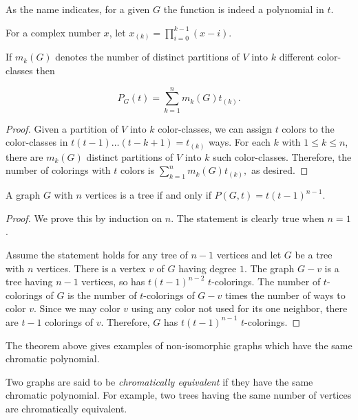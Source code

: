 As the name indicates, for a given $G$ the function is indeed a
polynomial in $t$.

For a complex number $x$, let $x_{(k)}=\prod_{i=0}^{k-1} (x-i)$.

\begin{lemma}
If $m_k(G)$ denotes the number of distinct partitions of $V$
into $k$ different color-classes then

\[
P_G(t) = \sum_{k=1}^n m_k(G)t_{(k)}.
\]
\end{lemma}


\begin{proof}
Given a partition of $V$ into $k$ color-classes, we can assign
$t$ colors to the color-classes in $t(t-1)\dots (t-k+1)=t_{(k)}$ ways.
For each $k$ with $1\leq k\leq n$, there are
$m_k(G)$ distinct partitions of $V$ into $k$ such color-classes.
Therefore, the number of colorings with $t$ colors is
$ \sum_{k=1}^n m_k(G)t_{(k)},$ as desired.

\end{proof}



\begin{theorem}
A graph $G$ with $n$ vertices is a tree if and only if $P(G, t) =
t(t-1)^{n-1}$.
\end{theorem}

\begin{proof}
We prove this by induction on $n$. The statement is clearly
true when $n=1$.

Assume the statement holds for any tree of $n-1$ vertices
and let $G$ be a tree with $n$ vertices. There is a vertex $v$
of $G$ having degree $1$. The graph $G-v$ is a tree having $n-1$
vertices, so has $t(t-1)^{n-2}$ $t$-colorings. The number of
$t$-colorings of $G$ is the number of $t$-colorings of $G-v$ times the
number of ways to color $v$. Since we may color $v$ using any
color not used for its one neighbor, there are $t-1$ colorings of $v$.
Therefore, $G$ has $t(t-1)^{n-1}$ $t$-colorings.

\end{proof}

The theorem above gives examples of non-isomorphic graphs which have
the same chromatic polynomial.


Two graphs are said to be {\it chromatically equivalent} if they have the
same chromatic polynomial. For example, two trees having the same
number of vertices are chromatically equivalent.

